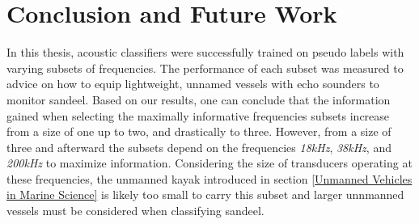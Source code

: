 \chapter{Conclusion and Future Work}
    In this thesis, acoustic classifiers were successfully trained on pseudo labels with varying subsets of frequencies. The performance of each subset was measured to advice on how to equip lightweight, unnamed vessels with echo sounders to monitor sandeel. Based on our results, one can conclude that the information gained when selecting the maximally informative frequencies subsets increase from a size of one up to two, and drastically to three. However, from a size of three and afterward the subsets depend on the frequencies \textit{18kHz}, \textit{38kHz}, and \textit{200kHz} to maximize information. Considering the size of transducers operating at these frequencies, the unmanned kayak introduced in section \ref{Unmanned Vehicles in Marine Science} is likely too small to carry this subset and larger unnmanned vessels must be considered when classifying sandeel.
    
    
    

